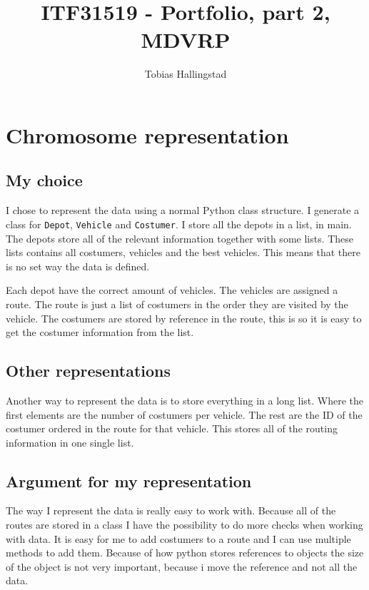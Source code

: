 \documentclass[10pt]{article}
\title{ITF31519 - Portfolio, part 2, MDVRP}
\author{Tobias Hallingstad}
\begin{document}
    \begin{titlepage}
        \maketitle
    \end{titlepage}




    \section{Chromosome representation}
    \subsection{My choice}
    I chose to represent the data using a normal Python class structure. I generate a class for \texttt{Depot}, \texttt{Vehicle} and \texttt{Costumer}. I store all the depots in a list, in main. The depots store all of the relevant information together with some lists. These lists contains all costumers, vehicles and the best vehicles. This means that there is no set way the data is defined. 

    Each depot have the correct amount of vehicles. The vehicles are assigned a route. The route is just a list of costumers in the order they are visited by the vehicle. The costumers are stored by reference in the route, this is so it is easy to get the costumer information from the list.

    \subsection{Other representations}
    Another way to represent the data is to store everything in a long list. Where the first elements are the number of costumers per vehicle. The rest are the ID of the costumer ordered in the route for that vehicle. This stores all of the routing information in one single list.

    \subsection{Argument for my representation}
    The way I represent the data is really easy to work with. Because all of the routes are stored in a class I have the possibility to do more checks when working with data. It is easy for me to add costumers to a route and I can use multiple methods to add them. Because of how python stores references to objects the size of the object is not very important, because i move the reference and not all the data.
\end{document}
